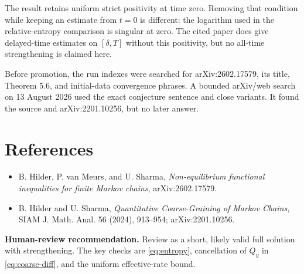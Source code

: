 \documentclass[11pt]{article}
\begin{document}
The result retains uniform strict positivity at time zero. Removing that
condition while keeping an estimate from \(t=0\) is different: the logarithm
used in the relative-entropy comparison is singular at zero. The cited paper
does give delayed-time estimates on \([\delta,T]\) without this positivity,
but no all-time strengthening is claimed here.

Before promotion, the run indexes were searched for arXiv:2602.17579, its
title, Theorem 5.6, and initial-data convergence phrases. A bounded arXiv/web
search on 13 August 2026 used the exact conjecture sentence and close
variants. It found the source and arXiv:2201.10256, but no later answer.

\section*{References}

\begin{itemize}[leftmargin=2em,nosep]
\item B. Hilder, P. van Meurs, and U. Sharma,
\emph{Non-equilibrium functional inequalities for finite Markov chains},
arXiv:2602.17579.
\item B. Hilder and U. Sharma,
\emph{Quantitative Coarse-Graining of Markov Chains},
SIAM J. Math. Anal. 56 (2024), 913--954; arXiv:2201.10256.
\end{itemize}

\medskip
\noindent\textbf{Human-review recommendation.}
Review as a short, likely valid full solution with strengthening. The key
checks are \eqref{eq:entropy}, cancellation of \(Q_y\) in
\eqref{eq:coarse-diff}, and the uniform effective-rate bound.
\end{document}
